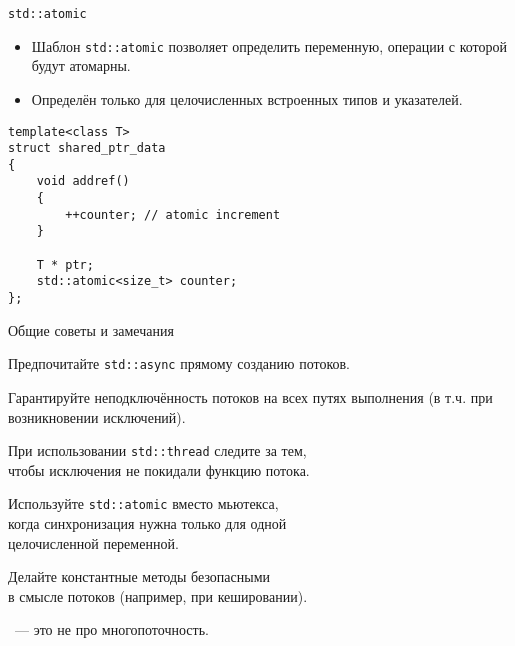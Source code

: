 \documentclass{beamer}
\begin{document}
\begin{frame}[fragile]{\texttt{std::atomic}}
    \begin{itemize}
        \item Шаблон \texttt{std::atomic} позволяет определить переменную,
            операции с которой будут атомарны.

        \item Определён только для целочисленных встроенных типов и указателей.
    \end{itemize}

\begin{lstlisting}
template<class T>
struct shared_ptr_data 
{
    void addref() 
    {
        ++counter; // atomic increment
    }
    
    T * ptr;
    std::atomic<size_t> counter;
};
\end{lstlisting}
\end{frame}

\begin{frame}{Общие советы и замечания}
    \begin{itemize}
        \pitem Предпочитайте \texttt{std::async} прямому созданию потоков.

        \pitem Гарантируйте неподключённость потоков на всех путях выполнения (в т.ч. при возникновении исключений).

        \pitem При использовании \texttt{std::thread} следите за тем,\\ чтобы исключения не покидали функцию потока.

        \pitem Используйте \texttt{std::atomic} вместо мьютекса,\\
            когда синхронизация нужна только для одной\\ целочисленной
            переменной.
            
        \pitem Делайте константные методы безопасными\\ в смысле потоков
            (например, при кешировании).
            
        \pitem {}~--- это не про многопоточность.
    \end{itemize}
\end{frame}
\end{document}
